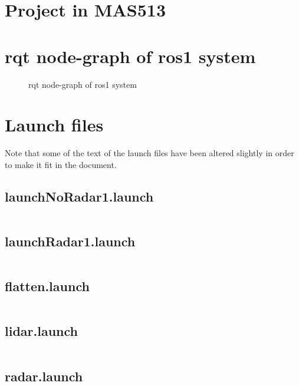 \appendix

\chapter{Project in MAS513}
\label{Appdix:MAS513}
 

\chapter{rqt node-graph of ros1 system}
\label{Appdix:rqtROS1NB}
\newpage
\begin{figure}[H]

  \caption{rqt node-graph of ros1 system}
  \label{fig:Appdix:rqt:ros1_noBridge}
\end{figure}

\chapter{Launch files}
Note that some of the text of the launch files have been altered slightly in order to make it fit in the document.
\section{launchNoRadar1.launch}
\label{Appdix:launchNoRadar1.launch}
\inputminted{xml}{ros_system/launch/launchNoRadar1.launch}

\section{launchRadar1.launch}
\label{Appdix:launchRadar1.launch}
\inputminted{xml}{ros_system/launch/launchRadar1.launch}
\section{flatten.launch}
\label{Appdix:flatten.launch}
\inputminted{xml}{ros_system/launch/src/sublaunch/flatten.launch}

\section{lidar.launch}
\label{Appdix:lidar.launch}
\inputminted{xml}{ros_system/launch/src/sublaunch/lidar.launch}

\section{radar.launch}
\label{Appdix:radar.launch}
\inputminted{xml}{ros_system/launch/src/sublaunch/radar.launch}

